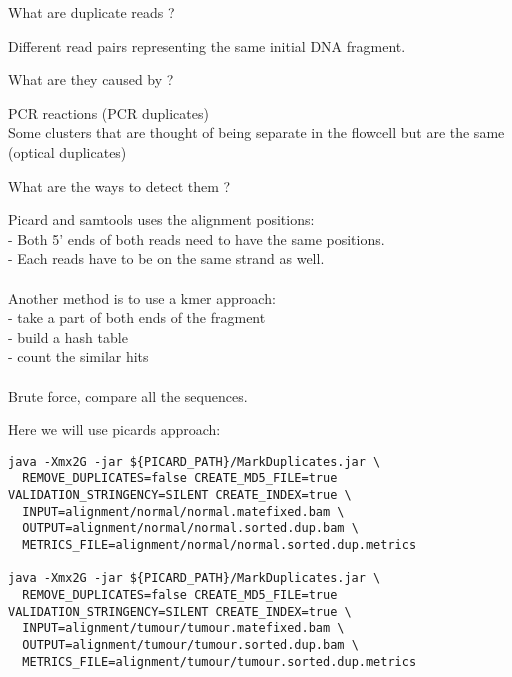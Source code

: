 \begin{questions}
What are duplicate reads ?
\end{questions}
\begin{answer}
Different read pairs representing the same initial DNA fragment.
\end{answer}

\begin{questions} 
What are they caused by ?
\end{questions}
\begin{answer}
PCR reactions (PCR duplicates) \\
Some clusters that are thought of being separate in the flowcell but are the same (optical duplicates)
\end{answer}

\begin{questions} 
What are the ways to detect them ?
\end{questions}
\begin{answer}
Picard and samtools uses the alignment positions: \\
   - Both 5' ends of both reads need to have the same positions. \\ 
   - Each reads have to be on the same strand as well. \\ \\
Another method is to use a kmer approach: \\
   - take a part of both ends of the fragment \\
   - build a hash table  \\
   - count the similar hits \\ \\
Brute force, compare all the sequences.
\end{answer}

Here we will use picards approach:
\begin{lstlisting}
java -Xmx2G -jar ${PICARD_PATH}/MarkDuplicates.jar \
  REMOVE_DUPLICATES=false CREATE_MD5_FILE=true VALIDATION_STRINGENCY=SILENT CREATE_INDEX=true \
  INPUT=alignment/normal/normal.matefixed.bam \
  OUTPUT=alignment/normal/normal.sorted.dup.bam \
  METRICS_FILE=alignment/normal/normal.sorted.dup.metrics

java -Xmx2G -jar ${PICARD_PATH}/MarkDuplicates.jar \
  REMOVE_DUPLICATES=false CREATE_MD5_FILE=true VALIDATION_STRINGENCY=SILENT CREATE_INDEX=true \
  INPUT=alignment/tumour/tumour.matefixed.bam \
  OUTPUT=alignment/tumour/tumour.sorted.dup.bam \
  METRICS_FILE=alignment/tumour/tumour.sorted.dup.metrics
\end{lstlisting}


